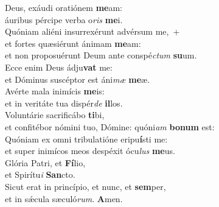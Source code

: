 \evenverse Deus, exáudi oratiónem \textbf{me}am:~\*\\
\evenverse áuribus pércipe verba o\textit{ris} \textbf{me}i.\\
\oddverse Quóniam aliéni insurrexérunt advérsum me,~+\\
\oddverse  et fortes quæsiérunt ánimam \textbf{me}am:~\*\\
\oddverse et non proposuérunt Deum ante conspé\textit{ctum} \textbf{su}um.\\
\evenverse Ecce enim Deus ádju\textbf{vat} me:~\*\\
\evenverse et Dóminus suscéptor est áni\textit{mæ} \textbf{me}æ.\\
\oddverse Avérte mala inimícis \textbf{me}is:~\*\\
\oddverse et in veritáte tua dispér\textit{de} \textbf{il}los.\\
\evenverse Voluntárie sacrificábo \textbf{ti}bi,~\*\\
\evenverse et confitébor nómini tuo, Dómine: quóni\textit{am} \textbf{bo}\textbf{num} est:\\
\oddverse Quóniam ex omni tribulatióne eripu\textbf{í}sti me:~\*\\
\oddverse et super inimícos meos despéxit ócu\textit{lus} \textbf{me}us.\\
\evenverse Glória Patri, et \textbf{Fí}lio,~\*\\
\evenverse et Spirítu\textit{i} \textbf{San}cto.\\
\oddverse Sicut erat in princípio, et nunc, et \textbf{sem}per,~\*\\
\oddverse et in sǽcula sæculó\textit{rum}. \textbf{A}men.\\
